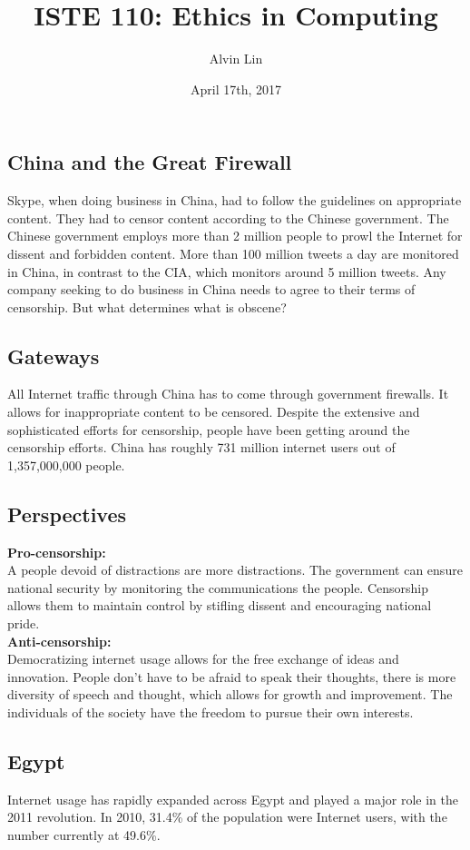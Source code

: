 \documentclass{article}
\title{ISTE 110: Ethics in Computing}
\author{Alvin Lin}
\date{April 17th, 2017}
\begin{document}
\maketitle

\subsection*{China and the Great Firewall}
Skype, when doing business in China, had to follow the guidelines on
appropriate content. They had to censor content according to the Chinese
government. The Chinese government employs more than 2 million people to
prowl the Internet for dissent and forbidden content. More than 100 million
tweets a day are monitored in China, in contrast to the CIA, which monitors
around 5 million tweets. Any company seeking to do business in China needs to
agree to their terms of censorship. But what determines what is obscene?

\subsection*{Gateways}
All Internet traffic through China has to come through government firewalls.
It allows for inappropriate content to be censored. Despite the extensive
and sophisticated efforts for censorship, people have been getting around
the censorship efforts. China has roughly 731 million internet users out of
1,357,000,000 people.

\subsection*{Perspectives}
\textbf{Pro-censorship:} \\
A people devoid of distractions are more distractions. The government can ensure
national security by monitoring the communications the people. Censorship
allows them to maintain control by stifling dissent and encouraging national
pride. \\
\textbf{Anti-censorship:} \\
Democratizing internet usage allows for the free exchange of ideas and
innovation. People don't have to be afraid to speak their thoughts, there is
more diversity of speech and thought, which allows for growth and improvement.
The individuals of the society have the freedom to pursue their own interests.

\subsection*{Egypt}
Internet usage has rapidly expanded across Egypt and played a major role in
the 2011 revolution. In 2010, 31.4\% of the population were Internet users,
with the number currently at 49.6\%.
\end{document}
